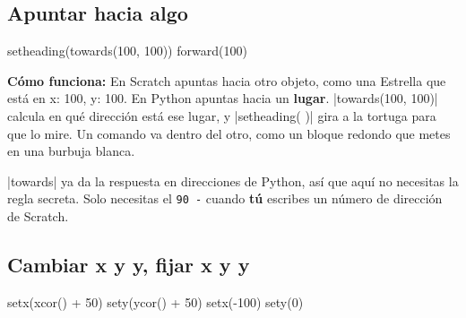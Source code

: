 \subsection*{Apuntar hacia algo}

\begin{tcbraster}[raster columns=5, raster equal height=rows, raster column skip=12pt, raster valign=center]
\begin{tcolorbox}[raster multicolumn=2, colback=white, colframe=white, boxrule=0pt, valign=center]
\begin{scratch}
\end{scratch}
\end{tcolorbox}
\begin{tcolorbox}[raster multicolumn=3, blank]
\begin{code}
setheading(towards(100, 100))
forward(100)
\end{code}
\end{tcolorbox}
\end{tcbraster}

\textbf{Cómo funciona:} En Scratch apuntas hacia otro objeto, como una Estrella que está en x: 100, y: 100. En Python apuntas hacia un \textbf{lugar}. \py|towards(100, 100)| calcula en qué dirección está ese lugar, y \py|setheading( )| gira a la tortuga para que lo mire. Un comando va dentro del otro, como un bloque redondo que metes en una burbuja blanca.

\begin{think}
\py|towards| ya da la respuesta en direcciones de Python, así que aquí no necesitas la regla secreta. Solo necesitas el \texttt{90 -} cuando \textbf{tú} escribes un número de dirección de Scratch.
\end{think}

\subsection*{Cambiar x y y, fijar x y y}

\begin{tcbraster}[raster columns=2, raster equal height=rows, raster column skip=12pt, raster valign=center]
\begin{tcolorbox}[colback=white, colframe=white, boxrule=0pt, valign=center]
\begin{scratch}
\end{scratch}
\end{tcolorbox}
\begin{code}
setx(xcor() + 50)
sety(ycor() + 50)
setx(-100)
sety(0)
\end{code}
\end{tcbraster}

